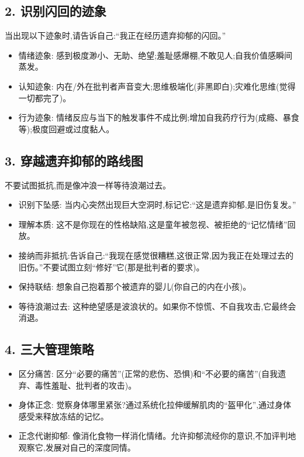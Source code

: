 \documentclass[11pt, a4paper]{article}
\begin{document}
\subsection*{2. 识别闪回的迹象}
当出现以下迹象时,请告诉自己:“我正在经历遗弃抑郁的闪回。”
\begin{itemize}
    \item 情绪迹象: 感到极度渺小、无助、绝望;羞耻感爆棚,不敢见人;自我价值感瞬间蒸发。
    \item 认知迹象: 内在/外在批判者声音变大;思维极端化(非黑即白);灾难化思维(觉得一切都完了)。
    \item 行为迹象: 情绪反应与当下的触发事件不成比例;增加自我药疗行为(成瘾、暴食等);极度回避或过度黏人。
\end{itemize}

\subsection*{3. 穿越遗弃抑郁的路线图}
不要试图抵抗,而是像冲浪一样等待浪潮过去。
\begin{itemize}
    \item 识别下坠感: 当内心突然出现巨大空洞时,标记它:“这是遗弃抑郁,是旧伤复发。”
    \item 理解本质: 这不是你现在的性格缺陷,这是童年被忽视、被拒绝的“记忆情绪”回放。
    \item 接纳而非抵抗:告诉自己:“我现在感觉很糟糕,这很正常,因为我正在处理过去的旧伤。”不要试图立刻“修好”它(那是批判者的要求)。
    \item 保持联结: 想象自己抱着那个被遗弃的婴儿(你自己的内在小孩)。
    \item 等待浪潮过去: 这种绝望感是波浪状的。如果你不惊慌、不自我攻击,它最终会消退。
\end{itemize}

\subsection*{4. 三大管理策略}
\begin{itemize}
    \item 区分痛苦: 区分“必要的痛苦”(正常的悲伤、恐惧)和“不必要的痛苦”(自我遗弃、毒性羞耻、批判者的攻击)。
    \item 身体正念: 觉察身体哪里紧张?通过系统化拉伸缓解肌肉的“盔甲化”,通过身体感受来释放冻结的记忆。
    \item 正念代谢抑郁: 像消化食物一样消化情绪。允许抑郁流经你的意识,不加评判地观察它,发展对自己的深度同情。
\end{itemize}
\end{document}
